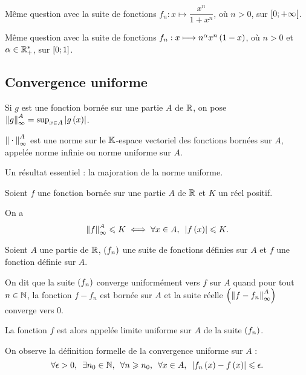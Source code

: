 \begin{exo}
Même question avec la suite de fonctions \(f_n:x\mapsto\dfrac{x^n}{1+x^n}\), où \(n>0\), sur \(\left[0;+\infty\right[\).
\end{exo}

\begin{exo}
Même question avec la suite de fonctions \(f_n:x\longmapsto n^\alpha x^n\left(1-x\right)\), où \(n>0\) et \(\alpha\in\mathbb{R}_+^*\), sur \(\left[0;1\right]\). 
\end{exo}

\subsection{Convergence uniforme}

\begin{rappel}
Si \(g\) est une fonction bornée sur une partie \(A\) de \(\mathbb{R}\), on pose \(\norme{g}_\infty^A=\sup_{x\in A}\abs{g\paren{x}}\).

\(\norme{}_\infty^A\) est une norme sur le \(\mathbb{K}\)-espace vectoriel des fonctions bornées sur \(A\), appelée norme infinie ou norme uniforme sur \(A\).
\end{rappel}

Un résultat essentiel : la majoration de la norme uniforme.

\begin{prop}
Soient \(f\) une fonction bornée sur une partie \(A\) de \(\mathbb{R}\) et \(K\) un réel positif.

On a \[\norme{f}_\infty^A\leq K\ssi\quantifs{\forall x\in A}\abs{f\paren{x}}\leq K.\]
\end{prop}

\begin{defi}
Soient \(A\) une partie de \(\mathbb{R}\), \(\left(f_n\right)\) une suite de fonctions définies sur \(A\) et \(f\) une fonction définie sur \(A\).

On dit que la suite \(\left(f_n\right)\) converge uniformément vers \(f\) sur \(A\) quand pour tout \(n\in\mathbb{N}\), la fonction \(f-f_n\) est bornée sur \(A\) et la suite réelle \(\paren{\norme{f-f_n}_\infty^A}\) converge vers \(0\).

La fonction \(f\) est alors appelée limite uniforme sur \(A\) de la suite \(\left(f_n\right)\).
\end{defi}

On observe la définition formelle de la convergence uniforme sur \(A\) : \[\quantifs{\forall\epsilon>0;\exists n_0\in\N;\forall n\geq n_0;\forall x\in A}\abs{f_n\paren{x}-f\paren{x}}\leq\epsilon.\]

